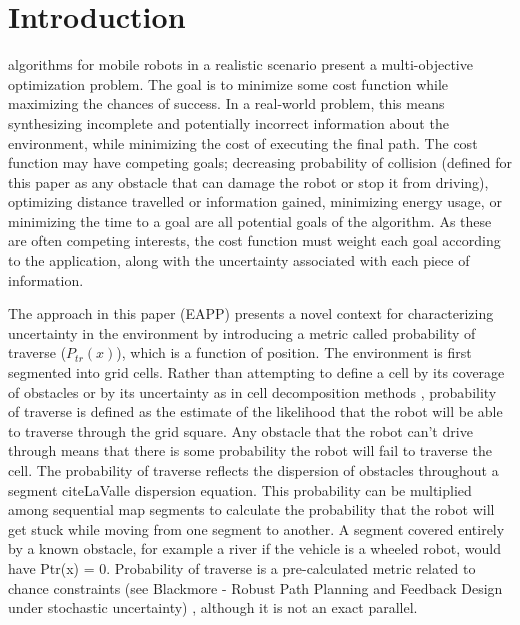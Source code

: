 \documentclass[journal]{IEEEtran}
\begin{document}

\IEEEpeerreviewmaketitle



\section{Introduction}
 algorithms for mobile robots in a realistic scenario present a multi-objective optimization problem. The goal is to minimize some cost function while maximizing the chances of success. 
In a real-world problem, this means synthesizing incomplete and potentially incorrect information about the environment, while minimizing the cost of executing the final path. 
The cost function may have competing goals; decreasing probability of collision (defined for this paper as any obstacle that can damage the robot or stop it from driving), optimizing distance travelled or information gained, minimizing energy usage, or minimizing the time to a goal are all potential goals of the algorithm.
As these are often competing interests, the cost function must weight each goal according to the application, along with the uncertainty associated with each piece of information. 

The approach in this paper (EAPP) presents a novel context for characterizing uncertainty in the environment by introducing a metric called probability of traverse ($P_{tr}(x)$), which is a function of position. 
The environment is first segmented into grid cells.
 Rather than attempting to define a cell by its coverage of obstacles or by its uncertainty as in cell decomposition methods \cite{mobile robotics textbook}, probability of traverse is defined as the estimate of the likelihood that the robot will be able to traverse through the grid square. 
Any obstacle that the robot can’t drive through means that there is some probability the robot will fail to traverse the cell. The probability of traverse reflects the dispersion of obstacles throughout a segment cite{LaValle dispersion equation}. 
This probability can be multiplied among sequential map segments to calculate the probability that the robot will get stuck while moving from one segment to another. 
A segment covered entirely by a known obstacle, for example a river if the vehicle is a wheeled robot, would have Ptr(x) = 0. 
Probability of traverse is a pre-calculated metric related to chance constraints (see Blackmore - Robust Path Planning and Feedback Design under stochastic uncertainty) \cite{Blackmore}, although it is not an exact parallel.
\end{document}
